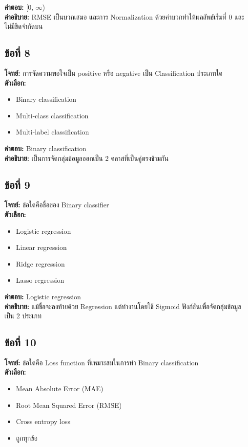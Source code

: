 \documentclass[12pt]{article}
\begin{document}
\textbf{คำตอบ:} [0, $\infty$)\\
\textbf{คำอธิบาย:} RMSE เป็นบวกเสมอ และการ Normalization ด้วยค่าบวกทำให้ผลลัพธ์เริ่มที่ 0 และไม่มีขีดจำกัดบน

\subsection*{ข้อที่ 8}
\textbf{โจทย์:} การจัดความพอใจเป็น positive หรือ negative เป็น Classification ประเภทใด\\
\textbf{ตัวเลือก:}
\begin{itemize}
    \item Binary classification
    \item Multi-class classification
    \item Multi-label classification
\end{itemize}

\textbf{คำตอบ:} Binary classification\\
\textbf{คำอธิบาย:} เป็นการจัดกลุ่มข้อมูลออกเป็น 2 คลาสที่เป็นคู่ตรงข้ามกัน

\subsection*{ข้อที่ 9}
\textbf{โจทย์:} ข้อใดคือชื่อของ Binary classifier\\
\textbf{ตัวเลือก:}
\begin{itemize}
    \item Logistic regression
    \item Linear regression
    \item Ridge regression
    \item Lasso regression
\end{itemize}

\textbf{คำตอบ:} Logistic regression\\
\textbf{คำอธิบาย:} แม้ชื่อจะลงท้ายด้วย Regression แต่ทำงานโดยใช้ Sigmoid ฟังก์ชันเพื่อจัดกลุ่มข้อมูลเป็น 2 ประเภท

\subsection*{ข้อที่ 10}
\textbf{โจทย์:} ข้อใดคือ Loss function ที่เหมาะสมในการทำ Binary classification\\
\textbf{ตัวเลือก:}
\begin{itemize}
    \item Mean Absolute Error (MAE)
    \item Root Mean Squared Error (RMSE)
    \item Cross entropy loss
    \item ถูกทุกข้อ
\end{itemize}
\end{document}

